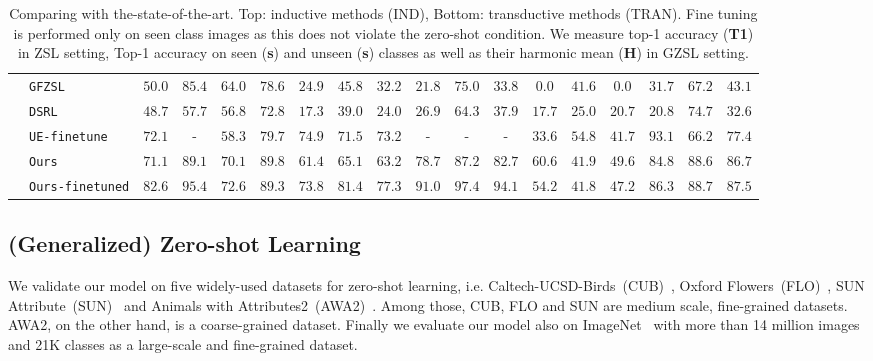 \documentclass[10pt,twocolumn,letterpaper]{article}
\begin{document}
{\begin{table*}[t]
{\begin{tabular}{l l c c c c |c c c |c c c |c c c | c c c  }
     & \texttt{GFZSL}~\cite{verma2017simple} &  $50.0$ & $85.4$ & $64.0$ & $78.6$ & $24.9$ & $45.8$ & $32.2$ & $21.8$ & $75.0$ & $33.8$ &  $0.0$ & $41.6$ & $0.0$ & $31.7$ & $67.2$ & $43.1$ \\  
      & \texttt{DSRL}~\cite{ye2017zero} &  $48.7$ & $57.7$ & $56.8$ & $72.8$ & $17.3$ & $39.0$ & $24.0$ & $26.9$ & $64.3$ & $37.9$ &  $17.7$ & $25.0$ & $20.7$ & $20.8$ & $74.7$ & $32.6$ \\ 
      & \texttt{UE-finetune}~\cite{song2018transductive} &  $72.1$ & - & $58.3$ & $79.7$ & $74.9$  & $71.5$  & $73.2$  & - & - & -  & $33.6$  & $\mathbf{54.8}$ & $41.7$ & $\mathbf{93.1}$ & $66.2$  & $77.4$  \\    
    & \texttt{Ours} & $71.1$ & $89.1$ & $70.1$ & $\mathbf{89.8}$ & $61.4$ & $65.1$ & $63.2$ & $78.7$ & $87.2$ & $82.7$ & $\mathbf{60.6}$ & $41.9$ & $\mathbf{49.6}$ & $84.8$ & $88.6$  & $86.7$ \\    
    & \texttt{Ours-finetuned} & $\mathbf{82.6}$ & $\mathbf{95.4}$ &  $\mathbf{72.6}$ & $89.3$ & $\mathbf{73.8}$ & $\mathbf{81.4}$  & $\mathbf{77.3}$ &  $\mathbf{91.0}$ & $\mathbf{97.4}$ & $\mathbf{94.1}$ & $54.2$ & $41.8$ & $47.2$ & $86.3$ & $\mathbf{88.7}$ & $\mathbf{87.5}$
\end{tabular}
   } \vspace{-2mm}
\caption{Comparing with the-state-of-the-art. Top: inductive methods (IND), Bottom: transductive methods (TRAN). Fine tuning is performed only on seen class images as this does not violate the zero-shot condition. We measure top-1 accuracy (\textbf{T1}) in ZSL setting, Top-1 accuracy on seen (\textbf{s}) and unseen (\textbf{s}) classes as well as their harmonic mean (\textbf{H}) in GZSL setting.
}
\label{tab:zsl_main}
\end{table*}
}


\subsection{(Generalized) Zero-shot Learning}
We validate our model on five widely-used datasets for zero-shot learning, i.e. Caltech-UCSD-Birds~(CUB)~\cite{CaltechUCSDBirdsDataset}, Oxford Flowers~(FLO)~\cite{OxfordFlowersDataset}, SUN Attribute~(SUN)~\cite{PH12} and Animals with Attributes2~(AWA2)~\cite{xian2018zero}. Among those, CUB, FLO and SUN are medium scale, fine-grained datasets. AWA2, on the other hand, is a coarse-grained dataset. Finally we evaluate our model also on ImageNet~\cite{imagenet} with more than 14 million images and 21K classes as a large-scale and fine-grained dataset. 
\end{document}
